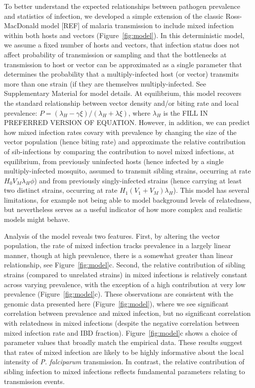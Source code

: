 \documentclass[9pt,lineno]{elife}
\begin{document}
To better understand the expected relationships between pathogen prevalence and statistics of infection, we developed a simple extension of the classic Ross-MacDonald model [REF] of malaria transmission to include mixed infection within both hosts and vectors (Figure~\ref{fig:model}). In this deterministic model, we assume a fixed number of hosts and vectors, that infection status does not affect probability of transmission or sampling and that the bottlenecks at transmission to host or vector can be approximated as a single parameter that determines the probability that a multiply-infected host (or vector) transmits more than one strain (if they are themselves multiply-infected.  See Supplementary Material for model details.  At equilibrium, this model recovers the standard relationship between vector density and/or biting rate and local prevalence: $P = (\lambda_H - \gamma \xi)/(\lambda_H + \lambda \xi)$, where $\lambda_H$ is the FILL IN PREFERRED VERSION OF EQUATION.  However, in addition, we  can predict how mixed infection rates covary with prevalence by changing the size of the vector population (hence biting rate) and approximate the relative contribution of sib-infections by comparing the contribution to novel mixed infections, at equilibrium, from previously uninfected hosts (hence infected by a single multiply-infected mosquito, assumed to transmit sibling strains, occurring at rate $H_0 V_M \lambda_H \phi$) and from previously singly-infected strains (hence carrying at least two distinct strains, occurring at rate $H_1 (V_1 + V_M) \lambda_H$).  This model has several limitations, for example not being able to model background levels of relatedness, but nevertheless serves as a useful indicator of how more complex and realistic models might behave.

Analysis of the model reveals two features.  First, by altering the vector population, the rate of mixed infection tracks prevalence in a largely linear manner, though at high prevalence, there is a somewhat greater than linear relationship, see Figure~\ref{fig:model}c.  Second, the relative contribution of sibling strains (compared to unrelated strains) in mixed infections is relatively constant across varying prevalence, with the exception of a  high contribution at very low prevalence (Figure~\ref{fig:model}c).  These observations are consistent with the genomic data presented here (Figure~\ref{fig:model}), where we see significant correlation between prevalence and mixed infection, but no significant correlation with relatedness in mixed infections (despite the negative correlation between mixed infection rate and IBD fraction).  Figure~\ref{fig:model}c shows a choice of parameter values that broadly match the empirical data.  These results suggest that rates of mixed infection are likely to be highly informative about the local intensity of {\it P. falciparum} transmission.  In contrast, the relative contribution of sibling infection to mixed infections reflects fundamental parameters relating to transmission events.
\end{document}
